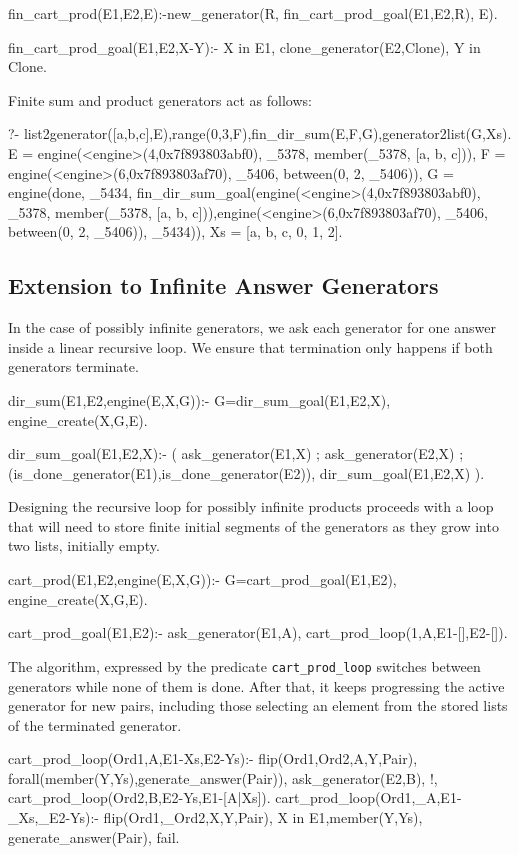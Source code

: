 \documentclass{new_tlp}
\begin{document}
\begin{code}
fin_cart_prod(E1,E2,E):-new_generator(R, fin_cart_prod_goal(E1,E2,R), E).

fin_cart_prod_goal(E1,E2,X-Y):-
  X in E1,
  clone_generator(E2,Clone),
  Y in Clone.  
\end{code}

\BX 
Finite sum and product generators act as follows:
\begin{codex}
?- list2generator([a,b,c],E),range(0,3,F),fin_dir_sum(E,F,G),generator2list(G,Xs).
E = engine(<engine>(4,0x7f893803abf0), _5378, member(_5378, [a, b, c])),
F = engine(<engine>(6,0x7f893803af70), _5406, between(0, 2, _5406)),
G = engine(done, _5434, fin_dir_sum_goal(engine(<engine>(4,0x7f893803abf0), _5378,
member(_5378, [a, b, c])),engine(<engine>(6,0x7f893803af70), _5406, 
between(0, 2, _5406)), _5434)),
Xs = [a, b, c, 0, 1, 2].
\end{codex}
\EX



\subsection{Extension to Infinite Answer Generators}

In the case of possibly infinite generators, we  ask each generator for one answer inside a linear recursive loop. We ensure that termination only happens if both generators terminate.
\begin{code}
dir_sum(E1,E2,engine(E,X,G)):-
  G=dir_sum_goal(E1,E2,X),
  engine_create(X,G,E).
  
dir_sum_goal(E1,E2,X):-
  ( ask_generator(E1,X)
  ; ask_generator(E2,X)
  ; \+ (is_done_generator(E1),is_done_generator(E2)),
    dir_sum_goal(E1,E2,X)
  ).  
\end{code}

Designing the recursive loop for possibly infinite products
proceeds with a loop that will need to store finite initial 
segments of the generators as they grow into two lists, initially
empty.
\begin{code}
cart_prod(E1,E2,engine(E,X,G)):-
  G=cart_prod_goal(E1,E2),
  engine_create(X,G,E).

cart_prod_goal(E1,E2):-
  ask_generator(E1,A),
  cart_prod_loop(1,A,E1-[],E2-[]).
\end{code}

The algorithm, expressed by the predicate {\tt cart\_prod\_loop}
switches between generators while none of them is done.
After that, it keeps progressing the active generator 
for new pairs, including those selecting an element 
from the stored lists of the terminated generator.
\begin{code}
cart_prod_loop(Ord1,A,E1-Xs,E2-Ys):-
  flip(Ord1,Ord2,A,Y,Pair),
  forall(member(Y,Ys),generate_answer(Pair)),
  ask_generator(E2,B),
  !,
  cart_prod_loop(Ord2,B,E2-Ys,E1-[A|Xs]).
cart_prod_loop(Ord1,_A,E1-_Xs,_E2-Ys):-
  flip(Ord1,_Ord2,X,Y,Pair),
  X in E1,member(Y,Ys),
  generate_answer(Pair),
  fail.
\end{code}
\end{document}
